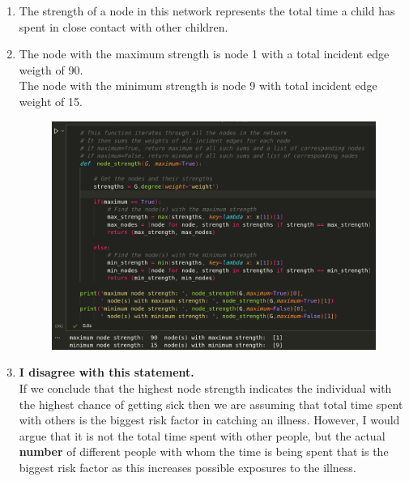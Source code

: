 \documentclass{article}
\begin{document}
    \begin{enumerate}[label=(\alph*), left=10pt, itemsep=10pt]
        
        \item \begin{minipage}[t]{0.9\textwidth}
            The strength of a node in this network represents the total time a child
            has spent in close contact with other children.
        \end{minipage}
        
        \item \begin{minipage}[t]{0.9\textwidth}
            The node with the maximum strength is node 1 with a total incident edge
            weigth of 90.\\
            The node with the minimum strength is node 9 with total incident edge
            weight of 15.
            \begin{figure}[H]
                \centering
                \includegraphics[width=1\textwidth, height=0.5\textheight]{./1b.png}
            \end{figure}
        \end{minipage}

        \item \begin{minipage}[t]{0.9\textwidth}
            \textbf{I disagree with this statement.}\\
            If we conclude that the highest node strength indicates the
            individual with the highest chance of getting sick then we are
            assuming that total time spent with others is the biggest risk
            factor in catching an illness. However, I would argue that it is
            not the total time spent with other people, but the actual
            \textbf{number} of different people with whom the time is being
            spent that is the biggest risk factor as this increases possible
            exposures to the illness.
            

\end{minipage}
\end{enumerate}
\end{document}
